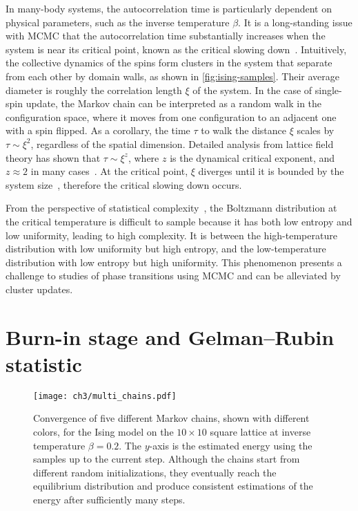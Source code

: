 In many-body systems, the autocorrelation time is particularly dependent on physical parameters, such as the inverse temperature $\beta$. It is a long-standing issue with MCMC that the autocorrelation time substantially increases when the system is near its critical point, known as the critical slowing down~\cite{goodman1989multigrid, wolff1990critical}. Intuitively, the collective dynamics of the spins form clusters in the system that separate from each other by domain walls, as shown in \cref{fig:ising-samples}. Their average diameter is roughly the correlation length $\xi$ of the system. In the case of single-spin update, the Markov chain can be interpreted as a random walk in the configuration space, where it moves from one configuration to an adjacent one with a spin flipped. As a corollary, the time $\tau$ to walk the distance $\xi$ scales by $\tau \sim \xi^2$, regardless of the spatial dimension. Detailed analysis from lattice field theory has shown that $\tau \sim \xi^z$, where $z$ is the dynamical critical exponent, and $z \approx 2$ in many cases~\cite{hohenberg1977theory}. At the critical point, $\xi$ diverges until it is bounded by the system size~\cite{lubetzky2012critical}, therefore the critical slowing down occurs.

From the perspective of statistical complexity~\cite{lopez1995statistical}, the Boltzmann distribution at the critical temperature is difficult to sample because it has both low entropy and low uniformity, leading to high complexity. It is between the high-temperature distribution with low uniformity but high entropy, and the low-temperature distribution with low entropy but high uniformity. This phenomenon presents a challenge to studies of phase transitions using MCMC and can be alleviated by cluster updates.

\section{Burn-in stage and Gelman--Rubin statistic}

\begin{figure}[htb]
\centering
\texttt{[image: ch3/multi\_chains.pdf]}
\caption[Convergence of multiple Markov chains]{
Convergence of five different Markov chains, shown with different colors, for the Ising model on the $10 \times 10$ square lattice at inverse temperature $\beta = 0.2$.
The $y$-axis is the estimated energy using the samples up to the current step.
Although the chains start from different random initializations, they eventually reach the equilibrium distribution and produce consistent estimations of the energy after sufficiently many steps.
}
\label{fig:multi-chains}
\end{figure}

